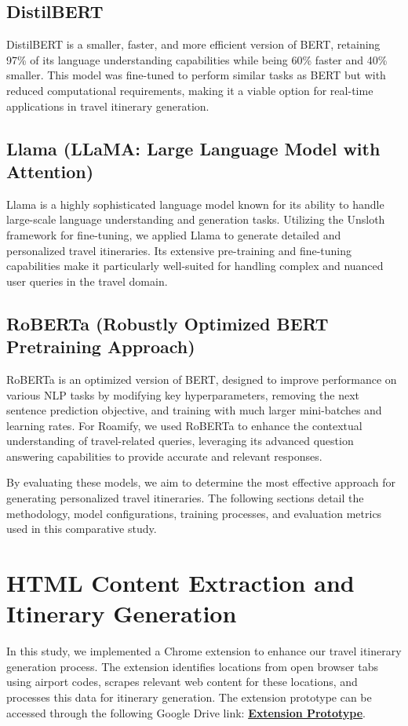 \documentclass[conference]{IEEEtran}
\begin{document}
    \subsection{DistilBERT}
        DistilBERT is a smaller, faster, and more efficient version of BERT, retaining 97\% of its language understanding capabilities while being 60\% faster and 40\% smaller. This model was fine-tuned to perform similar tasks as BERT but with reduced computational requirements, making it a viable option for real-time applications in travel itinerary generation.

    \subsection{Llama (LLaMA: Large Language Model with Attention)}
        Llama is a highly sophisticated language model known for its ability to handle large-scale language understanding and generation tasks. Utilizing the Unsloth framework for fine-tuning, we applied Llama to generate detailed and personalized travel itineraries. Its extensive pre-training and fine-tuning capabilities make it particularly well-suited for handling complex and nuanced user queries in the travel domain.

    \subsection{RoBERTa (Robustly Optimized BERT Pretraining Approach)}
        RoBERTa is an optimized version of BERT, designed to improve performance on various NLP tasks by modifying key hyperparameters, removing the next sentence prediction objective, and training with much larger mini-batches and learning rates. For Roamify, we used RoBERTa to enhance the contextual understanding of travel-related queries, leveraging its advanced question answering capabilities to provide accurate and relevant responses.

    By evaluating these models, we aim to determine the most effective approach for generating personalized travel itineraries. The following sections detail the methodology, model configurations, training processes, and evaluation metrics used in this comparative study.


\section{HTML Content Extraction and Itinerary Generation}

    In this study, we implemented a Chrome extension to enhance our travel itinerary generation process. The extension identifies locations from open browser tabs using airport codes, scrapes relevant web content for these locations, and processes this data for itinerary generation.
    The extension prototype can be accessed through the following Google Drive link: \href{https://drive.google.com/file/d/1qkj995W8CXmMslBy-55xUxxnHPPIOsoV/view?usp=sharing}{\textbf{Extension Prototype}}.
\end{document}
